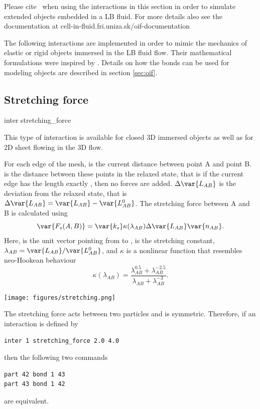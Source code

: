 \begin{citebox}
  Please cite~ when using the interactions
  in this section in order to simulate extended objects embedded in a
  LB fluid. For more details also see the documentation at cell-in-fluid.fri.uniza.sk/oif-documentation
\end{citebox}

The following interactions are implemented in order to mimic the mechanics of 
elastic or rigid objects immersed in the LB fluid flow. Their mathematical formulations 
were inspired by \cite{dupin07}. Details on how the bonds 
can be used for modeling objects are described in section \ref{sec:oif}.

\subsection{Stretching force}

\begin{essyntax}
  inter 
  stretching_force
   
\end{essyntax}
This type of interaction is available for closed 3D immersed objects as well as 
for 2D sheet flowing in the 3D flow. 

For each edge of the mesh,  is the current distance between point A 
and point B.  is the distance between these points in the relaxed 
state, that is if the current edge has the length exactly , then 
no forces are added. $\Delta \var{L_{AB}}$ is the deviation from the relaxed 
state, that is $\Delta \var{L_{AB}} = \var{L_{AB}} - \var{L_{AB}^0}$. The 
stretching force between A and B is calculated using 
\begin{equation}
\var{F_s(A,B)} = \var{k_s}\kappa(\lambda_{AB})\Delta \var{L_{AB}}\var{n_{AB}}.
\end{equation}
Here,  is the unit vector pointing from  to ,  
is the stretching constant, $\lambda_{AB} = \var{L_{AB}}/\var{L_{AB}^0}$, and 
$\kappa$ is a nonlinear function that resembles neo-Hookean behaviour
\begin{equation}
\kappa(\lambda_{AB}) = \frac{\lambda_{AB}^{0.5} + \lambda_{AB}^{-2.5}}
{\lambda_{AB} + \lambda_{AB}^{-3}}.
\end{equation}

\begin{center}
  \texttt{[image: figures/stretching.png]}
\end{center}
The stretching force acts between two particles and is symmetric. Therefore, if an interaction is defined by
\begin{verbatim} 
inter 1 stretching_force 2.0 4.0
\end{verbatim}
then the following two commands
\begin{verbatim} 
part 42 bond 1 43
part 43 bond 1 42
\end{verbatim}
are equivalent.

